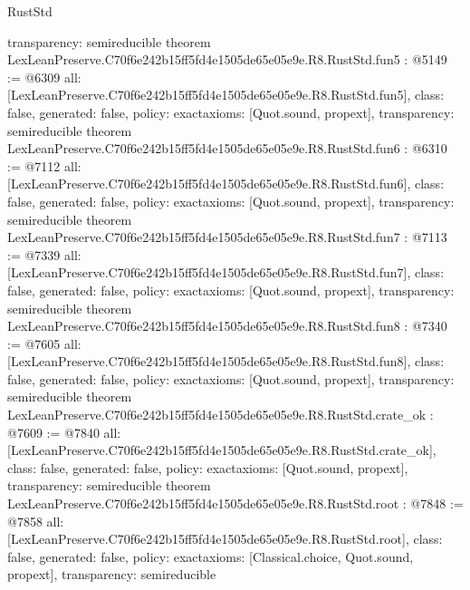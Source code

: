 \begin{lexlean}{RustStd}
\begin{coremodule}
{  transparency: semireducible
}
theorem LexLeanPreserve.C70f6e242b15ff5fd4e1505de65e05e9e.R8.RustStd.fun5 : @5149 := @6309 {
  all: [LexLeanPreserve.C70f6e242b15ff5fd4e1505de65e05e9e.R8.RustStd.fun5],
  class: false,
  generated: false,
  policy: exact{axioms: [Quot.sound, propext]},
  transparency: semireducible
}
theorem LexLeanPreserve.C70f6e242b15ff5fd4e1505de65e05e9e.R8.RustStd.fun6 : @6310 := @7112 {
  all: [LexLeanPreserve.C70f6e242b15ff5fd4e1505de65e05e9e.R8.RustStd.fun6],
  class: false,
  generated: false,
  policy: exact{axioms: [Quot.sound, propext]},
  transparency: semireducible
}
theorem LexLeanPreserve.C70f6e242b15ff5fd4e1505de65e05e9e.R8.RustStd.fun7 : @7113 := @7339 {
  all: [LexLeanPreserve.C70f6e242b15ff5fd4e1505de65e05e9e.R8.RustStd.fun7],
  class: false,
  generated: false,
  policy: exact{axioms: [Quot.sound, propext]},
  transparency: semireducible
}
theorem LexLeanPreserve.C70f6e242b15ff5fd4e1505de65e05e9e.R8.RustStd.fun8 : @7340 := @7605 {
  all: [LexLeanPreserve.C70f6e242b15ff5fd4e1505de65e05e9e.R8.RustStd.fun8],
  class: false,
  generated: false,
  policy: exact{axioms: [Quot.sound, propext]},
  transparency: semireducible
}
theorem LexLeanPreserve.C70f6e242b15ff5fd4e1505de65e05e9e.R8.RustStd.crate_ok : @7609 := @7840 {
  all: [LexLeanPreserve.C70f6e242b15ff5fd4e1505de65e05e9e.R8.RustStd.crate_ok],
  class: false,
  generated: false,
  policy: exact{axioms: [Quot.sound, propext]},
  transparency: semireducible
}
theorem LexLeanPreserve.C70f6e242b15ff5fd4e1505de65e05e9e.R8.RustStd.root : @7848 := @7858 {
  all: [LexLeanPreserve.C70f6e242b15ff5fd4e1505de65e05e9e.R8.RustStd.root],
  class: false,
  generated: false,
  policy: exact{axioms: [Classical.choice, Quot.sound, propext]},
  transparency: semireducible
}


\end{coremodule}
\end{lexlean}
